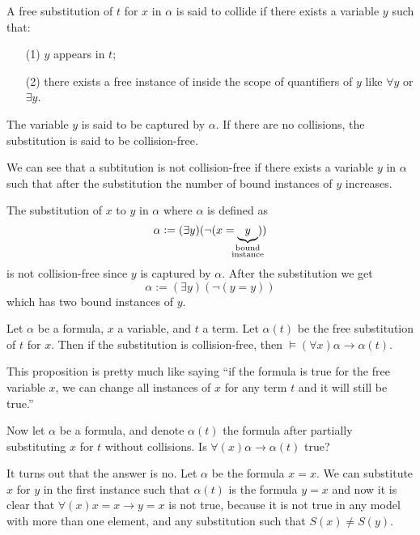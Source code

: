 \documentclass[11pt,a4paper]{article}
\renewcommand{\implies}{\rightarrow}
\begin{document}
  \begin{definition}
    A free substitution of $t$ for $x$ in $\alpha$ is said to collide 
    if there exists a variable $y$ such that:
    \begin{enumerate}
      \item [(1)] $y$ appears in $t$;
      \item [(2)] there exists a free instance of inside the scope of
        quantifiers of $y$ like $\forall y$ or $\exists y$.
    \end{enumerate}
    The variable $y$ is said to be captured by $\alpha$.
    If there are no collisions, the substitution is said to be 
    collision-free.
  \end{definition}

  \begin{remark}
    We can see that a subtitution is not collision-free if there exists
    a variable $y$ in $\alpha$ such that after the substitution the number
    of bound instances of $y$ increases.
  \end{remark}

  \begin{example}
    The substitution of $x$ to $y$ in $\alpha$ where $\alpha$ is defined
    as
    \[
      \alpha := (\exists y)(\neg (x = \underbrace{y}_{\mathclap{
      \substack{\text{bound} \\ \text{instance}}}}))
    \]
    is not collision-free since $y$ is captured by $\alpha$.
    After the substitution we get
    \[
      \alpha := (\exists y)(\neg (y = y))
    \]
    which has two bound instances of $y$.
  \end{example}

  \begin{proposition}
    Let $\alpha$ be a formula, $x$ a variable, and $t$ a term.
    Let $\alpha(t)$ be the free substitution of $t$ for $x$.
    Then if the substitution is collision-free,
    then $\models (\forall x) \alpha \implies \alpha(t)$.
  \end{proposition}

  This proposition is pretty much like saying ``if the formula is true
  for the free variable $x$, we can change all instances of $x$ for
  any term $t$ and it will still be true.''

  Now let $\alpha$ be a formula, and denote $\alpha(t)$ the formula after
  partially substituting $x$ for $t$ without collisions.
  Is $\forall(x) \alpha \implies \alpha(t)$ true?

  It turns out that the answer is no.
  Let $\alpha$ be the formula $x = x$.
  We can substitute $x$ for $y$ in the first instance such that
  $\alpha(t)$ is the formula $y = x$ and now it is clear that
  $\forall(x) x = x \implies y=x$ is not true,
  because it is not true in any model with more than one element,
  and any substitution such that $S(x) \neq S(y)$.
\end{document}
